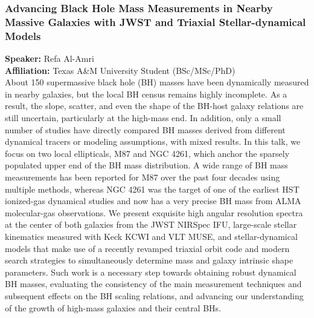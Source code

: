 \hypertarget{abs-14}{}
\subsubsection*{Advancing Black Hole Mass Measurements in Nearby Massive Galaxies with JWST and Triaxial Stellar-dynamical Models}
\textbf{Speaker:} Refa Al-Amri \\
\textbf{Affiliation:} Texas A\&M University \textperiodcentered{} Student (BSc/MSc/PhD)\\
About 150 supermassive black hole (BH) masses have been dynamically measured in nearby galaxies, but the local BH census remains highly incomplete. As a result, the slope, scatter, and even the shape of the BH-host galaxy relations are still uncertain, particularly at the high-mass end. In addition, only a small number of studies have directly compared BH masses derived from different dynamical tracers or modeling assumptions, with mixed results. In this talk, we focus on two local ellipticals, M87 and NGC 4261, which anchor the sparsely populated upper end of the BH mass distribution. A wide range of BH mass measurements has been reported for M87 over the past four decades using multiple methods, whereas NGC 4261 was the target of one of the earliest HST ionized-gas dynamical studies and now has a very precise BH mass from ALMA molecular-gas observations. We present exquisite high angular resolution spectra at the center of both galaxies from the JWST NIRSpec IFU, large-scale stellar kinematics measured with Keck KCWI and VLT MUSE, and stellar-dynamical models that make use of a recently revamped triaxial orbit code and modern search strategies to simultaneously determine mass and galaxy intrinsic shape parameters. Such work is a necessary step towards obtaining robust dynamical BH masses, evaluating the consistency of the main measurement techniques and subsequent effects on the BH scaling relations, and advancing our understanding of the growth of high-mass galaxies and their central BHs.

\hypertarget{abs-15}{}
